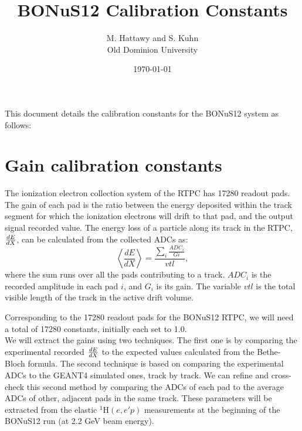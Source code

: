 \documentclass[12pt]{article}
\begin{document}
\title{BONuS12 Calibration Constants}

\vskip 0.5cm

\author{M. Hattawy and S. Kuhn\\ Old Dominion University}

\date \today
%
\maketitle

This document details the calibration constants for the BONuS12 system as 
follows:

\section*{}

   

   \section {Gain calibration constants}
 The ionization electron collection system of the RTPC has 17280 readout pads. The gain of 
      each pad is the ratio between the 
      energy deposited within the track segment
      for which the ionization electrons will drift to that pad, 
      and the output signal
      recorded value.      %
   The energy loss of a particle along its track in the RTPC,
$\small{\frac{dE}{dX}}$, can be calculated from the collected ADCs as: 
      \begin{equation}
 \left\langle \frac{dE}{dX} \right\rangle= \frac{\sum\limits_{i} \frac{ADC_{i}}{Gi}}{vtl},
\end{equation}
where the sum runs over all the pads contributing to a track. $ADC_{i}$ is the 
recorded amplitude in each pad $i$, and $G_{i}$ is its gain. The variable $vtl$ is the 
      total visible length of the track in the active drift volume. 

Corresponding to the 17280 readout pads for the BONuS12 RTPC, we will need a
   total of 17280 constants, initially each set to 1.0.
    ~\\

We will extract the gains using two techniques. The first 
      one is by comparing the experimental recorded $\small{\frac{dE}{dX}}$ to 
      the expected values calculated from the Bethe-Bloch formula. The second 
      technique is based on comparing the experimental ADCs to the GEANT4 
      simulated ones, track by track. We
       can refine and cross-check 
       this second method by 
      comparing the ADCs of each pad to the average ADCs of 
	other, adjacent pads in 
      the same track. These parameters will be extracted from the elastic 
      $^1$H$(e,e'p)$ measurements at the beginning of the BONuS12 run (at 2.2 GeV beam energy). 
\end{document}
